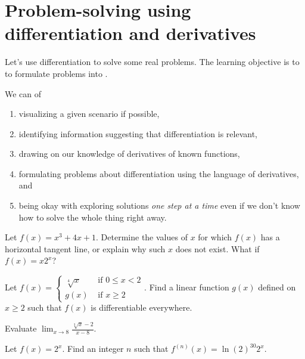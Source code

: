 \documentclass[../main.tex]{subfiles}
\begin{document}
 \section{Problem-solving using differentiation and derivatives}
Let's use differentiation to solve some real problems. The learning objective is to  to formulate problems into .

\label{page:diff-problem-solving}
We can  of
\begin{enumerate}
  \item visualizing a given scenario if possible, 
  \item identifying information suggesting that differentiation is relevant, 
  \item drawing on our knowledge of derivatives of known functions, 
  \item formulating problems about differentiation using the language of derivatives, and
  \item being okay with exploring solutions \emph{one step at a time} even if we don't know how to solve the whole thing right away.
\end{enumerate}

\bigskip
\begin{example}
  Let \(f(x) = x^{3} + 4x + 1\).  Determine the values of \(x\) for which \(f(x)\) has a horizontal tangent line, or explain why such \(x\) does not exist. What if \(f(x) = x 2^{x}\)?

\end{example}
\vfill{}
\clearpage


\begin{example}
  Let \(f(x) = \begin{cases} \sqrt[4]{x} &\text{ if } 0 \le x < 2 \\ g(x) &\text{ if } x \ge 2 \end{cases}\). Find a linear function \(g(x)\) defined on \(x \ge 2\) such that \(f(x)\) is differentiable everywhere.

\end{example}


\begin{example}
  Evaluate \(\lim_{x \to 8} \frac{\sqrt[3]{x} - 2}{x - 8}\).

\end{example}
\clearpage

\begin{example}
  Let \(f(x) = 2^{x}\). Find an integer \(n\) such that \(f^{(n)}(x) = \ln(2)^{30} 2^{x}\).

\end{example}
\end{document}
